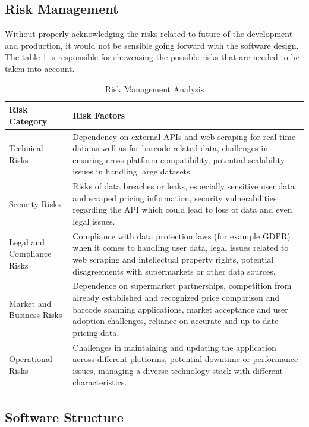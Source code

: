 \newpage

\subsection{Risk Management}

Without properly acknowledging the risks related to future of the development and production, it would not be sensible going forward with the software design. The table \ref{tab:risk} is responsible for showcasing the possible risks that are needed to be taken into account.

\begin{table}[ht]
	\centering
	\begin{tabularx}{\textwidth}{|l|X|}
		\hline
		\textbf{Risk Category} & \textbf{Risk Factors} \\ 
		\hline
		Technical Risks & Dependency on external APIs and web scraping for real-time data as well as for barcode related data, challenges in ensuring cross-platform compatibility, potential scalability issues in handling large datasets. \\ 
		\hline
		Security Risks & Risks of data breaches or leaks, especially sensitive user data and scraped pricing information, security vulnerabilities regarding the API which could lead to loss of data and even legal issues. \\ 
		\hline
		Legal and Compliance Risks & Compliance with data protection laws (for example GDPR) when it comes to handling user data, legal issues related to web scraping and intellectual property rights, potential disagreements with supermarkets or other data sources. \\ 
		\hline
		Market and Business Risks & Dependence on supermarket partnerships, competition from already established and recognized price comparison and barcode scanning applications, market acceptance and user adoption challenges, reliance on accurate and up-to-date pricing data. \\ 
		\hline
		Operational Risks & Challenges in maintaining and updating the application across different platforms, potential downtime or performance issues, managing a diverse technology stack with different characteristics. \\
		\hline
	\end{tabularx}
	\caption{Risk Management Analysis}
	\label{tab:risk}
\end{table}
\space

\subsection{Software Structure}

